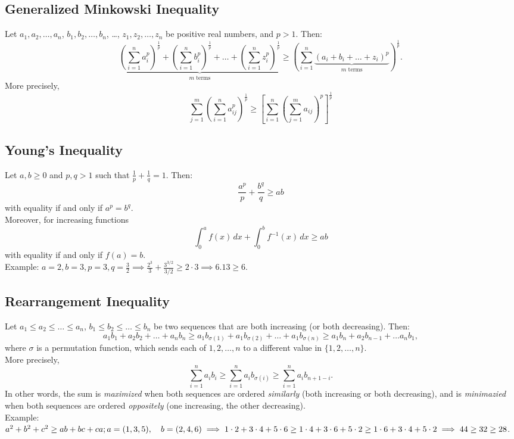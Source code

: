 \documentclass[a4paper,11pt]{article}
\begin{document}
\subsection{Generalized Minkowski Inequality}
\begin{tcolorbox}
    Let $a_1, a_2, \dots, a_n$, $b_1, b_2, \dots, b_n$, \dots, $z_1, z_2, \dots, z_n$ be positive real numbers, and $p>1$. Then:
    \[
    \underbrace{\left(\sum_{i=1}^n a_{i}^p\right)^\frac{1}{p} + \left(\sum_{i=1}^n b_{i}^p\right)^\frac{1}{p} + \dots + \left(\sum_{i=1}^n z_{i}^p\right)^\frac{1}{p}}_{m \text{ terms}} \geq \left(\sum_{i=1}^n\underbrace{(a_{i}+b_{i}+\dots+z_{i})^p}_{m \text{ terms}}\right)^\frac{1}{p}.
    \]
    More precisely,
    \[
    \sum_{j=1}^m \left(\sum_{i=1}^n a_{ij}^p\right)^\frac{1}{p} \geq \left[\sum_{i=1}^n \left(\sum_{j=1}^m a_{ij}\right)^p \right]^\frac{1}{p}
    \]
\end{tcolorbox}


\subsection{Young's Inequality}
\begin{tcolorbox}
    Let $a,b\geq0$ and $p,q>1$ such that $\frac{1}{p}+\frac{1}{q}=1$. Then:
    \[
    \frac{a^p}{p} + \frac{b^q}{q} \geq ab
    \]
    with equality if and only if $a^p=b^q$. \\[6pt]
    Moreover, for increasing functions
    \[
    \int_0^a f(x)\,dx + \int_0^b f^{-1}(x)\,dx \geq ab
    \]
    with equality if and only if $f(a)=b$. \\[6pt]
    Example: $\textstyle a=2,b=3,p=3,q=\frac{3}{2} \implies \frac{2^3}{3}+\frac{3^{3/2}}{3/2} \geq 2\cdot3 \implies 6.13 \geq 6.$
\end{tcolorbox}


\subsection{Rearrangement Inequality}
\begin{tcolorbox}
    Let $a_1 \leq a_2 \leq \dots \leq a_n$, $b_1 \leq b_2 \leq \dots \leq b_n$ be two sequences that are both increasing (or both decreasing). Then:
    \[
    a_1b_1 + a_2b_2 + \dots + a_nb_n \geq a_1b_{\sigma(1)} + a_1b_{\sigma(2)} + \dots + a_1b_{\sigma(n)} \geq a_1b_{n} + a_2b_{n-1} + \dots a_nb_{1}, 
    \]
    where $\sigma$ is a permutation function, which sends each of $1,2, \dots, n$ to a different value in $\{1,2,\dots,n\}$. \\[6pt]
    More precisely,
    \[
    \sum_{i=1}^n a_ib_i \geq \sum_{i=1}^n a_ib_{\sigma(i)} \geq \sum_{i=1}^n a_ib_{n+1-i}.
    \]
    In other words, the sum is \emph{maximized} when both sequences are ordered \emph{similarly} (both increasing or both decreasing), and is \emph{minimazied} when both sequences are ordered \emph{oppositely} (one increasing, the other decreasing). \\[6pt]
    Example: $\textstyle a^2+b^2+c^2 \geq ab + bc + ca; \\[6pt] 
    a=(1,3,5), \quad b=(2,4,6)
    \implies 1\cdot2+3\cdot4+5\cdot6 \geq 1\cdot4+3\cdot6+5\cdot2 \geq 1\cdot6+3\cdot4+5\cdot2 \implies 44 \geq 32 \geq 28$.
\end{tcolorbox}
\end{document}

